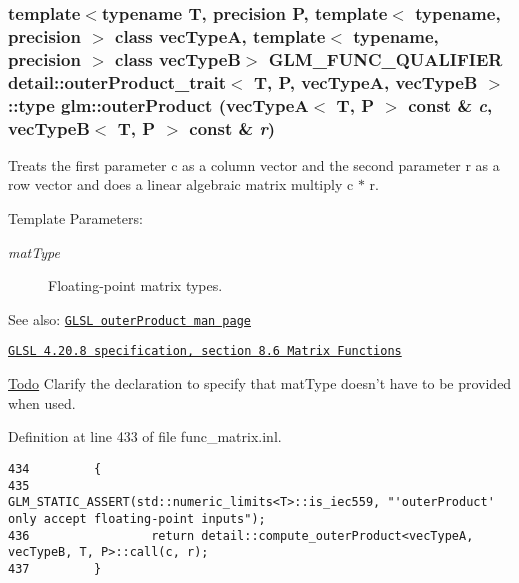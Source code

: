 \hypertarget{group__core__func__matrix_g47818f9809502f7a975a2c43a61fedb3}{
\subsubsection[outerProduct]{\setlength{\rightskip}{0pt plus 5cm}template$<$typename T, precision P, template$<$ typename, precision $>$ class vecTypeA, template$<$ typename, precision $>$ class vecTypeB$>$ GLM\_\-FUNC\_\-QUALIFIER detail::outerProduct\_\-trait$<$ T, P, vecTypeA, vecTypeB $>$::type glm::outerProduct (vecTypeA$<$ T, P $>$ const \& {\em c}, \/  vecTypeB$<$ T, P $>$ const \& {\em r})}}
\label{group__core__func__matrix_g47818f9809502f7a975a2c43a61fedb3}


Treats the first parameter c as a column vector and the second parameter r as a row vector and does a linear algebraic matrix multiply c $\ast$ r.

\begin{Desc}
\item[Template Parameters:]
\begin{description}
\item[{\em matType}]Floating-point matrix types.\end{description}
\end{Desc}
\begin{Desc}
\item[See also:]\href{http://www.opengl.org/sdk/docs/manglsl/xhtml/outerProduct.xml}{\tt GLSL outerProduct man page} 

\href{http://www.opengl.org/registry/doc/GLSLangSpec.4.20.8.pdf}{\tt GLSL 4.20.8 specification, section 8.6 Matrix Functions}\end{Desc}
\begin{Desc}
\item[\hyperlink{todo__todo000048}{Todo}]Clarify the declaration to specify that matType doesn't have to be provided when used. \end{Desc}


Definition at line 433 of file func\_\-matrix.inl.

\begin{Code}\begin{verbatim}434         {
435                 GLM_STATIC_ASSERT(std::numeric_limits<T>::is_iec559, "'outerProduct' only accept floating-point inputs");
436                 return detail::compute_outerProduct<vecTypeA, vecTypeB, T, P>::call(c, r);
437         }
\end{verbatim}
\end{Code}


